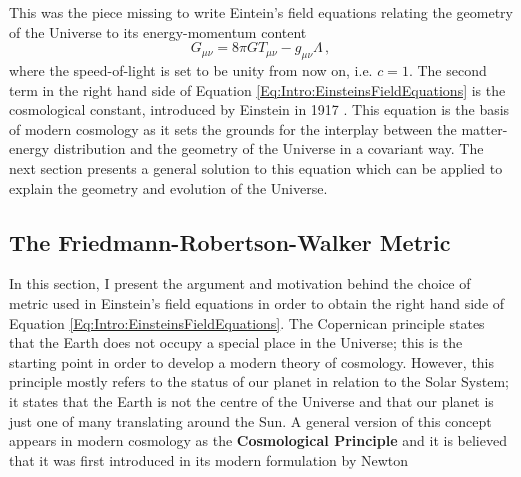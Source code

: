 \qquad This was the piece missing to write Eintein's field equations relating the geometry of the Universe to its energy-momentum content
\begin{equation}
G_{\mu\nu} = 8\pi GT_{\mu\nu} - g_{\mu\nu}\Lambda\, ,
\label{Eq:Intro:EinsteinsFieldEquations}
\end{equation}
where the speed-of-light is set to be unity from now on, i.e. $c=1$. The second term in the right hand side of Equation \eqref{Eq:Intro:EinsteinsFieldEquations} is the cosmological constant, introduced by Einstein in 1917 \citep{Peacock,dods,schneider_2016,2018LambdaCentury}. This equation is the basis of modern cosmology as it sets the grounds for the interplay between the matter-energy distribution and the geometry of the Universe in a covariant way. The next section presents a general solution to this equation which can be applied to explain the geometry and evolution of the Universe.

\subsection{The Friedmann-Robertson-Walker Metric}
In this section, I present the argument and motivation behind the choice of metric used in Einstein's field equations in order to obtain the right hand side of Equation \eqref{Eq:Intro:EinsteinsFieldEquations}. 
The Copernican principle states that the Earth does not occupy a special place in the Universe; this is the starting point in order to develop a modern theory of cosmology. However, this principle mostly refers to the status of our planet in relation to the Solar System; it states that the Earth is not the centre of the Universe and that our planet is just one of many translating around the Sun. A general version of this concept appears in modern cosmology as the \textbf{Cosmological Principle} and it is believed that it was first introduced in its modern formulation by Newton \citep{newton1687}

